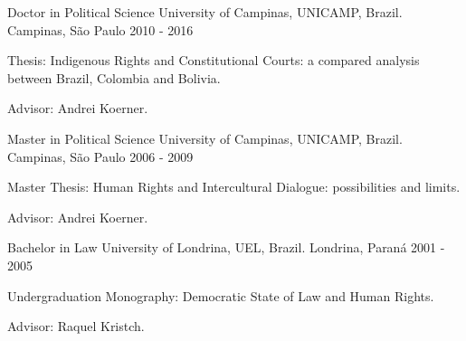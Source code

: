 \begin{cventries}
\cventry
{Doctor in Political Science} %
{University of Campinas, UNICAMP, Brazil.} %
{Campinas, São Paulo} %
{2010 - 2016} %
{
  \begin{cvitems} %
    \item Thesis: Indigenous Rights and Constitutional Courts: a compared analysis between Brazil, Colombia and Bolivia.
    \item Advisor: Andrei Koerner.
  \end{cvitems}
}

\cventry
{Master in Political Science}
{University of Campinas, UNICAMP, Brazil.}
{Campinas, São Paulo}
{2006 - 2009}
{
\begin{cvitems}
  \item Master Thesis: Human Rights and Intercultural Dialogue: possibilities and limits.
  \item Advisor: Andrei Koerner.
 \end{cvitems}
}

\cventry
{Bachelor in Law}
{University of Londrina, UEL, Brazil.}
{Londrina, Paraná}
{2001 - 2005}
{
\begin{cvitems}
  \item Undergraduation Monography: Democratic State of Law and Human Rights.
  \item Advisor: Raquel Kristch.
 \end{cvitems}
}

\end{cventries}

